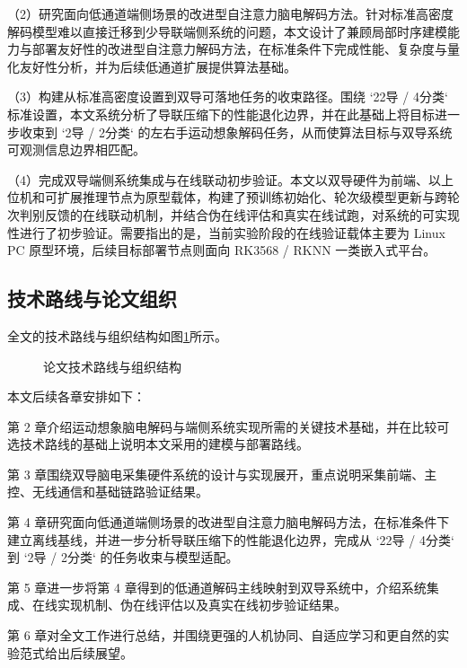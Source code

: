 （2）研究面向低通道端侧场景的改进型自注意力脑电解码方法。针对标准高密度解码模型难以直接迁移到少导联端侧系统的问题，本文设计了兼顾局部时序建模能力与部署友好性的改进型自注意力解码方法，在标准条件下完成性能、复杂度与量化友好性分析，并为后续低通道扩展提供算法基础。

（3）构建从标准高密度设置到双导可落地任务的收束路径。围绕 `22导 / 4分类` 标准设置，本文系统分析了导联压缩下的性能退化边界，并在此基础上将目标进一步收束到 `2导 / 2分类` 的左右手运动想象解码任务，从而使算法目标与双导系统可观测信息边界相匹配。

（4）完成双导端侧系统集成与在线联动初步验证。本文以双导硬件为前端、以上位机和可扩展推理节点为原型载体，构建了预训练初始化、轮次级模型更新与跨轮次判别反馈的在线联动机制，并结合伪在线评估和真实在线试跑，对系统的可实现性进行了初步验证。需要指出的是，当前实验阶段的在线验证载体主要为 Linux PC 原型环境，后续目标部署节点则面向 RK3568 / RKNN 一类嵌入式平台。

\subsection{技术路线与论文组织}

全文的技术路线与组织结构如图\ref{fig:org}所示。
\begin{figure}[htbp]
  \centering
  \caption{论文技术路线与组织结构}
  \label{fig:org}
\end{figure}

本文后续各章安排如下：

第 2 章介绍运动想象脑电解码与端侧系统实现所需的关键技术基础，并在比较可选技术路线的基础上说明本文采用的建模与部署路线。

第 3 章围绕双导脑电采集硬件系统的设计与实现展开，重点说明采集前端、主控、无线通信和基础链路验证结果。

第 4 章研究面向低通道端侧场景的改进型自注意力脑电解码方法，在标准条件下建立离线基线，并进一步分析导联压缩下的性能退化边界，完成从 `22导 / 4分类` 到 `2导 / 2分类` 的任务收束与模型适配。

第 5 章进一步将第 4 章得到的低通道解码主线映射到双导系统中，介绍系统集成、在线实现机制、伪在线评估以及真实在线初步验证结果。

第 6 章对全文工作进行总结，并围绕更强的人机协同、自适应学习和更自然的实验范式给出后续展望。
